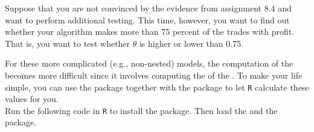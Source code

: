 \setcounter{chapter}{8}
\setcounter{section}{5}
\setcounter{question}{0}



Suppose that you are not convinced by the evidence from assignment 8.4 and want to perform additional testing. This time, however, you want to find out whether your algorithm makes more than 75 percent of the trades with profit. That is, you want to test whether $\theta$ is higher or lower than 0.75.\\



For these more complicated (e.g., non-nested) models, the computation of the  becomes more difficult since it involves computing the  of the . To make your life simple, you can use the  package together with the  package to let \texttt{R} calculate these values for you. \\

Run the following code in \texttt{R} to install the  package. Then load the  and the  package. \\
\\

